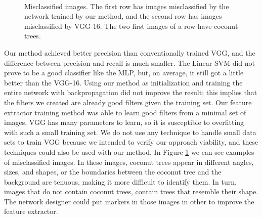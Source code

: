 \documentclass[a4paper,conference]{IEEEtran}
\begin{document}
\begin{figure}
{  }
  ~
  \caption{Misclassified images. The first row has images misclassified by the network trained by our method, and the second row has images misclassified by VGG-16. The two first images of a row have coconut trees.}
  \label{fig:ex-classification}
\end{figure}

Our method achieved better precision than conventionally trained VGG, and the difference between precision and recall is much smaller. The Linear SVM did not prove to be a good classifier like the MLP, but, on average, it still got a little better than the VGG-16. Using our method as initialization and training the entire network with backpropagation did not improve the result; this implies that the filters we created are already good filters given the training set. Our feature extractor training method was able to learn good filters from a minimal set of images. VGG has many parameters to learn, so it is susceptible to overfitting with such a small training set. We do not use any technique to handle small data sets to train VGG because we intended to verify our approach viability, and these techniques could also be used with our method. In Figure \ref{fig:ex-classification} we can see examples of misclassified images. In these images, coconut trees appear in different angles, sizes, and shapes, or the boundaries between the coconut tree and the background are tenuous, making it more difficult to identify them. In turn, images that do not contain coconut trees, contain trees that resemble their shape. The network designer could put markers in those images in other to improve the feature extractor.
\end{document}
